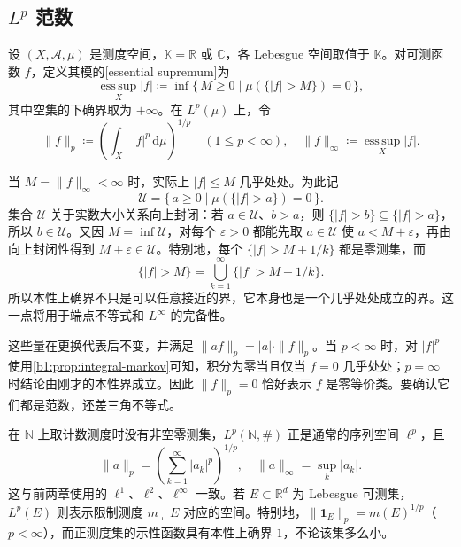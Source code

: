 \subsection{\texorpdfstring{\(L^p\)}{Lp} 范数}
\label{b1:subsec:100102}

\begin{definition}\label{b1:def:essential-supremum}
设 \((X,\mathcal A,\mu)\) 是测度空间，\(\mathbb K=\mathbb R\) 或 \(\mathbb C\)，各 Lebesgue 空间取值于 \(\mathbb K\)。对可测函数 \(f\)，定义其模的[essential supremum]为
\[
 \operatorname*{ess\,sup}_{X}|f|
 \coloneqq\inf\bigl\{\,M\geq0\mid\mu(\{|f|>M\})=0\,\bigr\},
\]
其中空集的下确界取为 \(+\infty\)。在 \(L^p(\mu)\) 上，令
\[
 \|f\|_p\coloneqq\left(\int_X|f|^p\,\mathrm d\mu\right)^{1/p}
 \quad(1\leq p<\infty),
 \quad \|f\|_\infty\coloneqq\operatorname*{ess\,sup}_{X}|f|.
\]
\end{definition}

当 \(M=\|f\|_\infty<\infty\) 时，实际上 \(|f|\leq M\) 几乎处处。为此记
\[
 \mathcal U=\bigl\{\,a\geq0\mid\mu(\{|f|>a\})=0\,\bigr\}.
\]
集合 \(\mathcal U\) 关于实数大小关系向上封闭：若 \(a\in\mathcal U\)、\(b>a\)，则
\(\{|f|>b\}\subseteq\{|f|>a\}\)，所以 \(b\in\mathcal U\)。又因 \(M=\inf\mathcal U\)，对每个 \(\varepsilon>0\) 都能先取 \(a\in\mathcal U\) 使 \(a<M+\varepsilon\)，再由向上封闭性得到 \(M+\varepsilon\in\mathcal U\)。特别地，每个 \(\{|f|>M+1/k\}\) 都是零测集，而
\[
 \{|f|>M\}=\bigcup_{k=1}^{\infty}\{|f|>M+1/k\}.
\]
所以本性上确界不只是可以任意接近的界，它本身也是一个几乎处处成立的界。这一点将用于端点不等式和 \(L^\infty\) 的完备性。

\ProseParagraphBreak

这些量在更换代表后不变，并满足 \(\|af\|_p=|a|\cdot\|f\|_p\)。当 \(p<\infty\) 时，对 \(|f|^p\) 使用\cref{b1:prop:integral-markov}可知，积分为零当且仅当 \(f=0\) 几乎处处；\(p=\infty\) 时结论由刚才的本性界成立。因此 \(\|f\|_p=0\) 恰好表示 \(f\) 是零等价类。要确认它们都是范数，还差三角不等式。

\ProseParagraphBreak

在 \(\mathbb N\) 上取计数测度时没有非空零测集，\(L^p(\mathbb N,\#)\) 正是通常的序列空间 \(\ell^p\)，且
\[
 \|a\|_p=\left(\sum_{k=1}^{\infty}|a_k|^p\right)^{1/p},
 \quad \|a\|_\infty=\sup_k|a_k|.
\]
这与前两章使用的 \(\ell^1\)、\(\ell^2\)、\(\ell^\infty\) 一致。若 \(E\subset\mathbb R^d\) 为 Lebesgue 可测集，\(L^p(E)\) 则表示限制测度 \(m\llcorner E\) 对应的空间。特别地，\(\|\mathbf1_E\|_p=m(E)^{1/p}\)（\(p<\infty\)），而正测度集的示性函数具有本性上确界 \(1\)，不论该集多么小。


